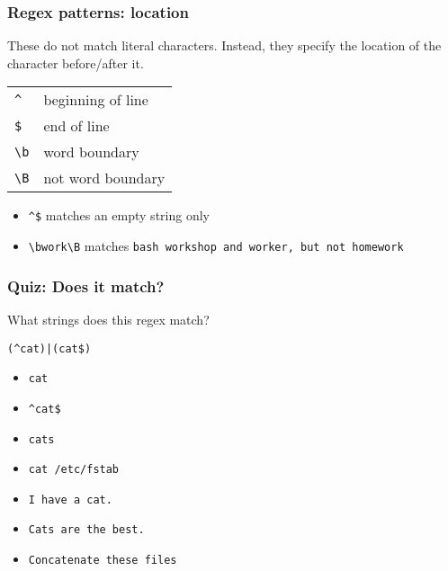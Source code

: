 \begin{frame}[fragile]
\frametitle{Regex patterns: location}
These do not match literal characters. Instead, they specify the location of
the character before/after it.
\begin{table}
    \centering
    \begin{tabular}{ll}
        \verb|^|            & beginning of line \\
        \verb|$|            & end of line \\
        \verb|\b|           & word boundary \\
        \verb|\B|           & not word boundary \\
    \end{tabular}
\end{table}

\begin{example}
    \begin{itemize}
        \item \verb|^$| matches an empty string only
        \item \verb|\bwork\B| matches \tt{bash workshop} and \tt{worker},
            but not \tt{homework}
    \end{itemize}
\end{example}
\end{frame}

\begin{frame}[fragile]
\frametitle{Quiz: Does it match?}
What strings does this regex match? \newline

\Large \verb!(^cat)|(cat$)! \normalsize

\begin{itemize}
    \item \verb|cat|                      %
    \item \verb|^cat$|                    %
    \item \verb|cats|                     %
    \item \verb|cat /etc/fstab|           %
    \item \verb|I have a cat.|            %
    \item \verb|Cats are the best.|       %
    \item \verb|Concatenate these files|  %
\end{itemize}
\end{frame}

